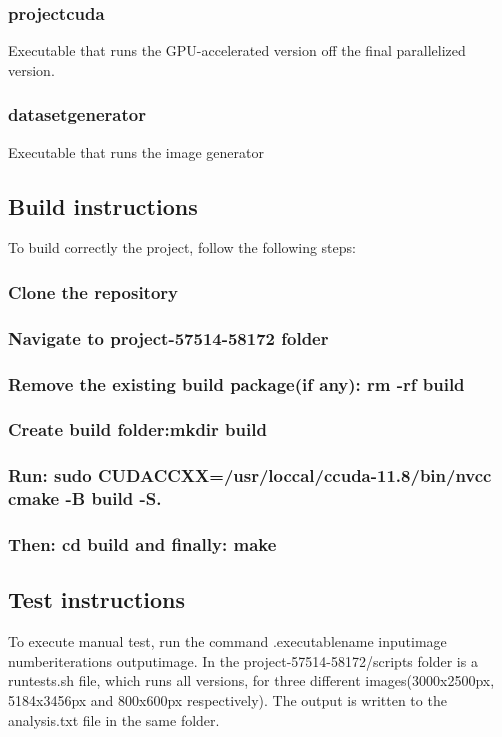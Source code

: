 \documentclass[sigconf]{acmart}
\begin{document}
\subsubsection{project\textunderscore cuda}
Executable that runs the GPU-accelerated version off the final parallelized version.

\subsubsection{dataset\textunderscore generator}
Executable that runs the image generator

\subsection{Build instructions}
To build correctly the project, follow the following steps:
\subsubsection{Clone the repository}
\subsubsection{Navigate to project-57514-58172 folder}
\subsubsection{Remove the existing build package(if any): rm -rf build}
\subsubsection{Create build folder:mkdir build}
\subsubsection{Run: sudo CUDACCXX=/usr/loccal/ccuda-11.8/bin/nvcc cmake -B build -S.}
\subsubsection{Then: cd build and finally: make}

\subsection{Test instructions}
To execute manual test, run the command .\/{executable\textunderscore name} input\textunderscore image number\textunderscore iterations output\textunderscore image. 
In the project-57514-58172/scripts folder is a run\textunderscore tests.sh file, which runs all versions, for three different images(3000x2500px, 5184x3456px and 800x600px respectively). The output is written to the analysis.txt file in the same folder.
\end{document}
